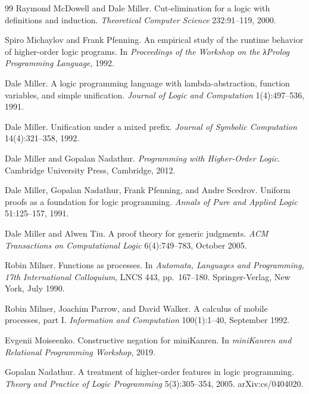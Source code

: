\begin{thebibliography}{99}
Raymond McDowell and Dale Miller.
\newblock Cut-elimination for a logic with definitions and induction.
\newblock \emph{Theoretical Computer Science} 232:91--119, 2000.

Spiro Michaylov and Frank Pfenning.
\newblock An empirical study of the runtime behavior of higher-order logic programs.
\newblock In \emph{Proceedings of the Workshop on the λProlog Programming Language}, 1992.

Dale Miller.
\newblock A logic programming language with lambda-abstraction, function variables, and simple unification.
\newblock \emph{Journal of Logic and Computation} 1(4):497--536, 1991.

Dale Miller.
\newblock Unification under a mixed prefix.
\newblock \emph{Journal of Symbolic Computation} 14(4):321--358, 1992.

Dale Miller and Gopalan Nadathur.
\newblock \emph{Programming with Higher-Order Logic}.
\newblock Cambridge University Press, Cambridge, 2012.

Dale Miller, Gopalan Nadathur, Frank Pfenning, and Andre Scedrov.
\newblock Uniform proofs as a foundation for logic programming.
\newblock \emph{Annals of Pure and Applied Logic} 51:125--157, 1991.

Dale Miller and Alwen Tiu.
\newblock A proof theory for generic judgments.
\newblock \emph{ACM Transactions on Computational Logic} 6(4):749--783, October 2005.

Robin Milner.
\newblock Functions as processes.
\newblock In \emph{Automata, Languages and Programming, 17th International Colloquium}, LNCS 443,
  pp.~167--180. Springer-Verlag, New York, July 1990.

Robin Milner, Joachim Parrow, and David Walker.
\newblock A calculus of mobile processes, part I.
\newblock \emph{Information and Computation} 100(1):1--40, September 1992.

Evgenii Moiseenko.
\newblock Constructive negation for miniKanren.
\newblock In \emph{miniKanren and Relational Programming Workshop}, 2019.

Gopalan Nadathur.
\newblock A treatment of higher-order features in logic programming.
\newblock \emph{Theory and Practice of Logic Programming} 5(3):305--354, 2005. arXiv:cs/0404020.


\end{thebibliography}
